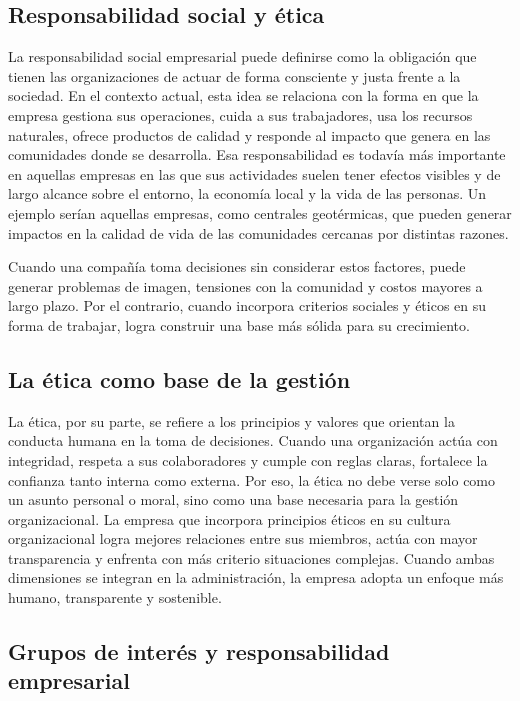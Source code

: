 \subsection*{Responsabilidad social y ética}

La responsabilidad social empresarial puede definirse como la obligación que tienen las organizaciones de actuar de forma consciente y justa frente a la sociedad. En el contexto actual, esta idea se relaciona con la forma en que la empresa gestiona sus operaciones, cuida a sus trabajadores, usa los recursos naturales, ofrece productos de calidad y responde al impacto que genera en las comunidades donde se desarrolla. Esa responsabilidad es todavía más importante en aquellas empresas en las que sus actividades suelen tener efectos visibles y de largo alcance sobre el entorno, la economía local y la vida de las personas. Un ejemplo serían aquellas empresas, como centrales geotérmicas, que pueden generar impactos en la calidad de vida de las comunidades cercanas por distintas razones. 

Cuando una compañía toma decisiones sin considerar estos factores, puede generar problemas de imagen, tensiones con la comunidad y costos mayores a largo plazo. Por el contrario, cuando incorpora criterios sociales y éticos en su forma de trabajar, logra construir una base más sólida para su crecimiento.

\subsection*{La ética como base de la gestión}

La ética, por su parte, se refiere a los principios y valores que orientan la conducta humana en la toma de decisiones. Cuando una organización actúa con integridad, respeta a sus colaboradores y cumple con reglas claras, fortalece la confianza tanto interna como externa. Por eso, la ética no debe verse solo como un asunto personal o moral, sino como una base necesaria para la gestión organizacional. La empresa que incorpora principios éticos en su cultura organizacional logra mejores relaciones entre sus miembros, actúa con mayor transparencia y enfrenta con más criterio situaciones complejas. Cuando ambas dimensiones se integran en la administración, la empresa adopta un enfoque más humano, transparente y sostenible.

\subsection*{Grupos de interés y responsabilidad empresarial}

